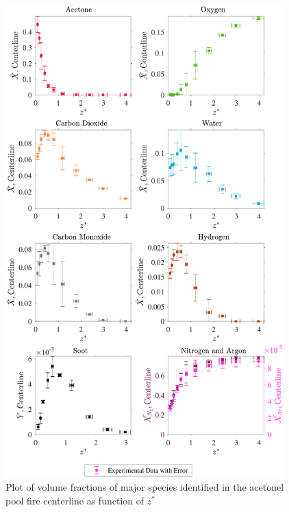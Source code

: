 \documentclass[12pt]{article}
\begin{document}
\begin{figure}[!h]
	\centering
\includegraphics[width=10.75cm,keepaspectratio]{Acetone_MOL_FRAC_Plot.pdf}
	\caption[Volume fractions of major species in the acetone plume]{Plot of volume fractions of major species identified in the acetonel pool fire centerline as function of $z^{*}$}
	\label{fig:Acetone_VOL_Frac_Major}
\end{figure}
\end{document}
